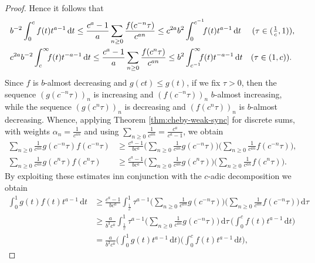 \documentclass[12pt, reqno]{amsart}%
\theoremstyle{plain}  %
\theoremstyle{definition}  %
\theoremstyle{remark}
\numberwithin{equation}{section}
\renewcommand{\d}{\,\mathrm{d}}
\begin{document}
\begin{proof}
Hence it follows that
\begin{align*}
&b^{-2}\int_{0}^{c} f(t)t^{a -1} \d t
\leq
\frac{c^a-1}{a}\sum_{n \geq 0}\frac{ f(c^{-n} \tau)}{c^{a n}}
\leq  	c^{2a}b^2\int_{0}^{c^{-1}} \hspace*{-1ex}f(t)t^{a -1} \d t
\quad  \,\, (\tau \in (\tfrac{1}{c},1)),\\
&%
c^{2a}b^{-2}\int_{c}^{\infty}\hspace*{-1ex}
f(t)t^{-a -1}  \d t
\leq
\frac{c^a-1}{a} \sum_{n \geq 0}\frac{f(c^{n} \tau) }{c^{a n}}
\leq b^2\int_{c^{-1}}^{\infty} \hspace*{-1ex}f(t)t^{-a -1}  \d t
\quad (\tau \in (1,c)).
\end{align*}
Since $f $  is $b$-almost decreasing and $g(ct) \leq g(t)$, if we  fix $\tau>0$,
then the sequence $(g(c^{-n} \tau))_n$ is increasing and $(f(c^{-n} \tau))_n$ $b$-almost increasing,
while the  sequence $(g(c^{n} \tau))_n$ is decreasing and $(f(c^{n} \tau))_n$ is $b$-almost decreasing.
Whence,  applying  Theorem \ref{thm:cheby-weak-sync} for discrete sums,  with weights $\alpha_n = \frac{1}{c^{a n}}$ and using
$\sum_{n \geq 0} \frac{1}{c^{a n}} = \frac{c^{a}}{c^{a}-1}$, we obtain
\begin{align*}
\sum_{n \geq 0} \frac{1}{c^{a n}} g(c^{-n} \tau)f(c^{-n} \tau)
&\geq  \frac{c^a-1}{bc^a}\Big( \sum_{n \geq 0} \frac{1}{c^{a n}} g(c^{-n} \tau) \Big)\Big(\sum_{n \geq 0} \frac{1}{c^{a n}} f(c^{-n} \tau)\Big),\\
\sum_{n \geq 0} \frac{1}{c^{a n}} g(c^{n} \tau)f(c^{n} \tau)
&\geq  \frac{c^a-1}{bc^a} \Big(\sum_{n \geq 0} \frac{1}{c^{a n}} g(c^{n} \tau)\Big) \Big(\sum_{n \geq 0} \frac{1}{c^{a n}} f(c^{n} \tau)\Big).
\end{align*}
By exploiting these estimates inn conjunction with the $c$-adic decomposition we obtain
\begin{align*}
\int_0^1g(t)f(t) t^{a -1} \d t
&\geq   \frac{c^a-1}{bc^a} \int_{\tfrac{1}{c}}^{1} \tau^{a -1} \Big(\sum_{n \geq 0} \frac{1}{c^{a n}} g(c^{-n} \tau) \Big)\Big( \sum_{n \geq 0} \frac{1}{c^{a n}} f(c^{-n} \tau)\Big) \d \tau\\
&\geq \frac{a}{b^{3}c^a} \int_{\tfrac{1}{c}}^{1} \tau^{a -1} \Big(\sum_{n \geq 0} \frac{1}{c^{a n}} g(c^{-n} \tau)\Big)  \d \tau\,  \Big(\int_0^c f(t)t^{a -1} \d t\Big)\\
&= \frac{a}{b^{3}c^a}	\Big(\int_0^1g(t)t^{a -1} \d t\Big) \Big(\int_0^c f(t)t^{a -1} \d t\Big),

\end{align*}
\end{proof}
\end{document}
